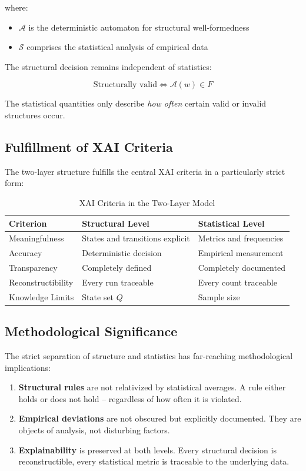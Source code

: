 \documentclass[
  12pt,
  a4paper,
  oneside,
  titlepage
]{article}
\begin{document}
where:
\begin{itemize}
    \item \(\mathcal{A}\) is the deterministic automaton for structural 
    well-formedness
    \item \(\mathcal{S}\) comprises the statistical analysis of empirical 
    data
\end{itemize}

The structural decision remains independent of statistics:

\[
\text{Structurally valid} \iff \mathcal{A}(w) \in F
\]

The statistical quantities only describe \textit{how often} certain valid or 
invalid structures occur.

\subsection{Fulfillment of XAI Criteria}

The two-layer structure fulfills the central XAI criteria in a particularly 
strict form:

\begin{table}[h]
\centering
\caption{XAI Criteria in the Two-Layer Model}
\label{tab:xai}
\begin{tabular}{@{} p{3cm} p{4cm} p{4cm} @{}}
\toprule
\textbf{Criterion} & \textbf{Structural Level} & \textbf{Statistical Level} \\
\midrule
Meaningfulness & States and transitions explicit & Metrics and frequencies \\
Accuracy & Deterministic decision & Empirical measurement \\
Transparency & Completely defined & Completely documented \\
Reconstructibility & Every run traceable & Every count traceable \\
Knowledge Limits & State set \(Q\) & Sample size \\
\bottomrule
\end{tabular}
\end{table}

\subsection{Methodological Significance}

The strict separation of structure and statistics has far-reaching methodological 
implications:

\begin{enumerate}
    \item \textbf{Structural rules} are not relativized by statistical averages. 
    A rule either holds or does not hold – regardless of how often it is violated.
    
    \item \textbf{Empirical deviations} are not obscured but explicitly 
    documented. They are objects of analysis, not disturbing factors.
    
    \item \textbf{Explainability} is preserved at both levels. Every structural 
    decision is reconstructible, every statistical metric is traceable to the 
    underlying data.
\end{enumerate}
\end{document}
